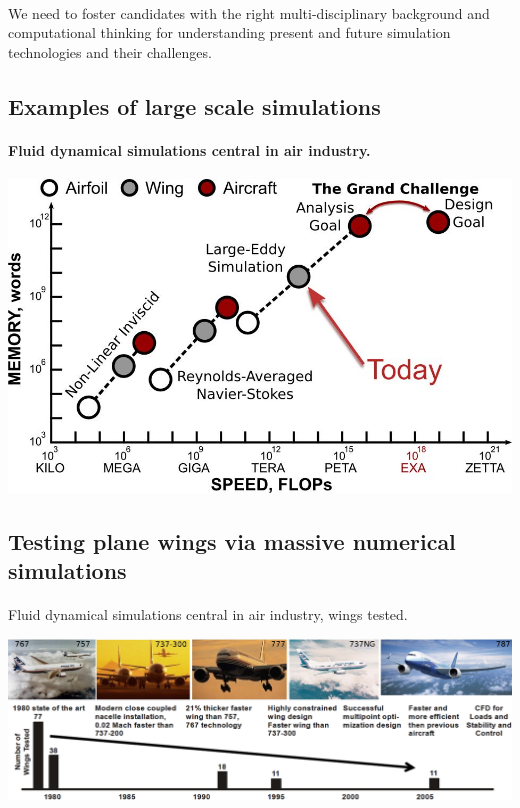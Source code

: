 \documentclass[%
twoside,                 %
final,                   %
10pt]{article}
\begin{document}
\paragraph{}
We need to foster candidates with the right
multi-disciplinary background and computational thinking for
understanding present and future simulation technologies and their challenges.




\subsection*{Examples of large scale simulations}

\paragraph{Fluid dynamical simulations central in air industry.}


\centerline{\includegraphics[width=0.6\linewidth]{fig-future/fig10.jpg}}




\subsection*{Testing plane wings via massive numerical simulations}

\paragraph{}
Fluid dynamical simulations central in air industry, wings tested.


\centerline{\includegraphics[width=1.0\linewidth]{fig-future/fig8.jpg}}
\end{document}
